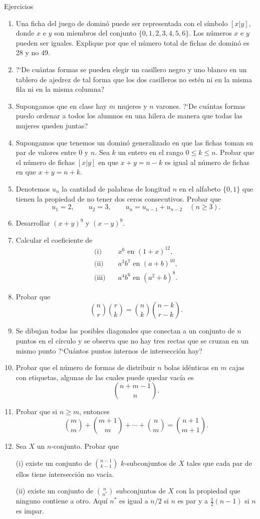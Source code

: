 \documentclass[11pt,spanish,makeidx]{amsbook}
\theoremstyle{definition}
\theoremstyle{remark}
\begin{document}
\begin{section}{Ejercicios}

\begin{enumerate}
\item Una ficha del juego de dominó puede ser representada con el símbolo $[x|y]$, donde $x$ e $y$ son miembros del conjunto $\{0,1,2,3,4,5,6\}$. Los números $x$ e $y$ pueden ser iguales. Explique por que el número total de fichas de dominó es 28 y no 49.
\item ?`De cuántas formas se pueden elegir un casillero negro y uno blanco en un tablero de ajedrez de tal forma que los dos casilleros no estén ni en la misma fila ni en la misma columna?
\item Supongamos que en clase hay $m$ mujeres y $n$ varones. ?`De cuántas formas puedo ordenar a todos los alumnos en una hilera de manera que todas las mujeres queden juntas?
\item Supongamos que tenemos un dominó generalizado en que las fichas toman su par de valores entre $0$ y $n$. Sea $k$ un entero en el rango $0\le k \le n$. Probar que el número de fichas $[x|y]$ en que $x+y = n-k$ es igual al número de fichas en que  $x+y = n+k$.
\item Denotemos $u_n$ la cantidad de palabras de longitud $n$ en el alfabeto $\{0,1\}$ que tienen la propiedad de no tener dos ceros consecutivos. Probar que
$$
u_1=2,\qquad u_2=3,\qquad u_n =u_{n-1} +u_{n-2}\quad (n \ge 3).
$$
\item Desarrollar $(x+y)^9$ y $(x-y)^9$.
\item Calcular el coeficiente de
$$
\begin{aligned}
\text{(i)}\quad & x^6 \text{ en } (1+x)^{12},\\
\text{(ii)}\quad & a^3 b^7 \text{ en } (a+b)^{10},\\
\text{(iii)}\quad & a^4 b^6 \text{ en } (a^2+b)^8.
\end{aligned}
$$
\item Probar que
$$
\binom{n}{r}\binom{r}{k}=\binom{n}{k}\binom{n-k}{r-k}.
$$
\item Se dibujan todas las posibles diagonales que conectan a un conjunto de $n$ puntos en el círculo y se observa que no hay tres rectas que se cruzan en un mismo punto ?`Cuántos puntos internos de intersección hay?
\item Probar que el número de formas de distribuir $n$ bolas idénticas en $m$ cajas con etiquetas, algunas de las cuales puede quedar vacía es
$$
\binom{n+m-1}{n}.
$$
\item Probar que si $n \ge m$, entonces
$$
\binom{m}{m}+\binom{m+1}{m}+\cdots+\binom{n}{m}=\binom{n+1}{m+1}.
$$
\item  Sea $X$ un $n$-conjunto. Probar que

(i) existe un conjunto de $\binom{n-1}{k-1}$ $k$-subconjuntos de $X$ tales que cada par de ellos tiene intersección no vacía.

(ii) existe un conjunto de $\binom{n}{n^*}$ subconjuntos de $X$ con la propiedad que ninguno contiene a otro. Aquí $n^*$ es igual a $n/2$ si $n$ es par y a $\frac12(n-1)$ si $n$ es impar.
\end{enumerate}

\end{section}
\end{document}
